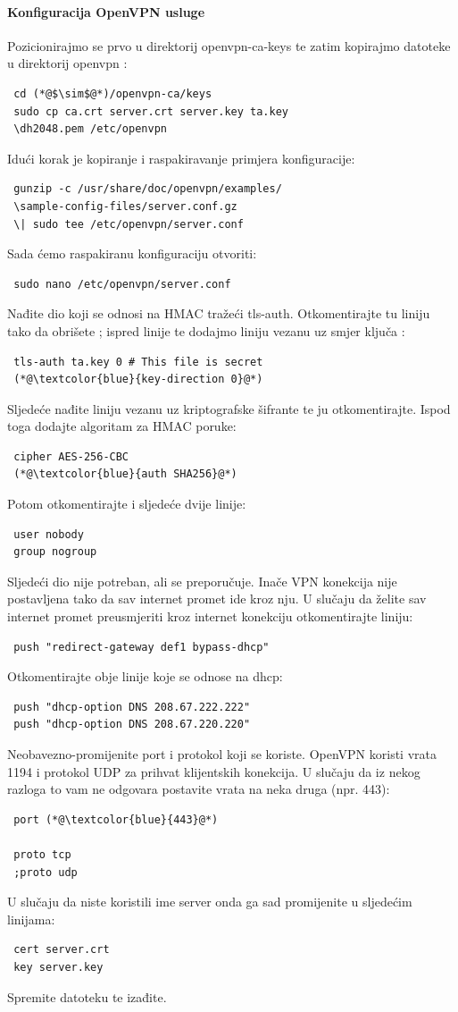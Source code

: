 \paragraph*{Konfiguracija OpenVPN usluge}
\hfill \smallbreak
Pozicionirajmo se prvo u direktorij openvpn-ca-keys te zatim kopirajmo datoteke u direktorij openvpn :
\begin{lstlisting}
 cd (*@$\sim$@*)/openvpn-ca/keys
 sudo cp ca.crt server.crt server.key ta.key 
 \dh2048.pem /etc/openvpn
\end{lstlisting}
Idući korak je kopiranje i raspakiravanje primjera konfiguracije:
\begin{lstlisting}
 gunzip -c /usr/share/doc/openvpn/examples/
 \sample-config-files/server.conf.gz 
 \| sudo tee /etc/openvpn/server.conf
\end{lstlisting}
Sada ćemo raspakiranu konfiguraciju otvoriti:
\begin{lstlisting}
 sudo nano /etc/openvpn/server.conf
\end{lstlisting}
Nađite dio koji se odnosi na HMAC tražeći tls-auth. Otkomentirajte tu liniju tako da obrišete ; ispred linije te dodajmo liniju vezanu uz smjer ključa : 
\begin{lstlisting}
 tls-auth ta.key 0 # This file is secret
 (*@\textcolor{blue}{key-direction 0}@*)
\end{lstlisting}
Sljedeće nađite liniju vezanu uz kriptografske šifrante  te ju otkomentirajte. Ispod toga dodajte algoritam za HMAC poruke:
\begin{lstlisting}
 cipher AES-256-CBC
 (*@\textcolor{blue}{auth SHA256}@*)
\end{lstlisting}
Potom otkomentirajte i sljedeće dvije linije:
\begin{lstlisting}
 user nobody
 group nogroup
\end{lstlisting}
Sljedeći dio nije potreban, ali se preporučuje. Inače VPN konekcija nije postavljena tako da sav internet promet ide kroz nju. U slučaju da želite sav internet promet preusmjeriti kroz internet konekciju otkomentirajte liniju:
\begin{lstlisting}
 push "redirect-gateway def1 bypass-dhcp"
\end{lstlisting}
Otkomentirajte obje linije koje se odnose na dhcp:
\begin{lstlisting}
 push "dhcp-option DNS 208.67.222.222"
 push "dhcp-option DNS 208.67.220.220"
\end{lstlisting}
Neobavezno-promijenite port i protokol koji se koriste. OpenVPN koristi vrata 1194 i protokol UDP za prihvat klijentskih konekcija. U slučaju da iz nekog razloga to vam ne odgovara postavite vrata na neka druga (npr. 443):
\begin{lstlisting}
 port (*@\textcolor{blue}{443}@*)
 
 proto tcp
 ;proto udp
\end{lstlisting}
U slučaju da niste koristili ime server onda ga sad promijenite u sljedećim linijama:
\begin{lstlisting}
 cert server.crt
 key server.key
\end{lstlisting}
Spremite datoteku te izađite.
\bigbreak
